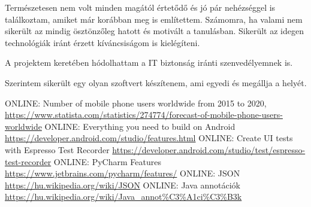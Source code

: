 \documentclass{thesis-ekf}
\theoremstyle{definition}
\theoremstyle{remark}
\begin{document}
Természetesen nem volt minden magától értetődő és jó pár nehézséggel is találkoztam, amiket már korábban meg is említettem.
Számomra, ha valami nem sikerült az mindig ösztönzőleg hatott és motivált a tanulásban. Sikerült az idegen technológiák iránt érzett kíváncsiságom is kielégíteni.

A projektem keretében hódolhattam a IT biztonság iránti szenvedélyemnek is.

Szerintem sikerült egy olyan szoftvert készítenem, ami egyedi és megállja a helyét.


\begin{thebibliography}{1}
 \textsc{ONLINE}: Number of mobile phone users worldwide from 2015 to 2020, \url{https://www.statista.com/statistics/274774/forecast-of-mobile-phone-users-worldwide}
 \textsc{ONLINE}: Everything you need to build on Android \url{https://developer.android.com/studio/features.html}
 \textsc{ONLINE}: Create UI tests with Espresso Test Recorder \url{https://developer.android.com/studio/test/espresso-test-recorder}
 \textsc{ONLINE}: PyCharm Features \url{https://www.jetbrains.com/pycharm/features/}
 \textsc{ONLINE}: JSON \url{https://hu.wikipedia.org/wiki/JSON}
 \textsc{ONLINE}: Java annotációk \url{https://hu.wikipedia.org/wiki/Java_annot%C3%A1ci%C3%B3k}
\end{thebibliography}
\end{document}
